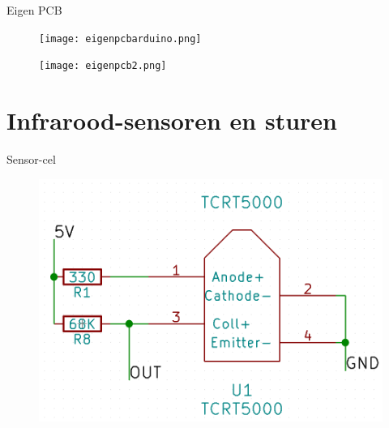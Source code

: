 \documentclass[t,12pt,english
\ifx\beamermode\undefined\else,\beamermode\fi
]{beamer}
\begin{document}
\begin{frame}{Eigen PCB}
\begin{figure}[H]
	\centering
	\begin{minipage}[b]{0.4\textwidth}
		\centering
		\texttt{[image: eigenpcbarduino.png]}
	\end{minipage}
	\hfill
	\begin{minipage}[b]{0.4\textwidth}
		\centering
		\texttt{[image: eigenpcb2.png]}
	\end{minipage}
\end{figure}
\end{frame}

\section{Infrarood-sensoren en sturen}
\begin{frame}{Sensor-cel}
\begin{figure}[H]
	\centering
	\includegraphics[width=\textwidth,height=0.8\textheight,keepaspectratio]{tcrt5000cel.png}
\end{figure}
\end{frame}
\end{document}
